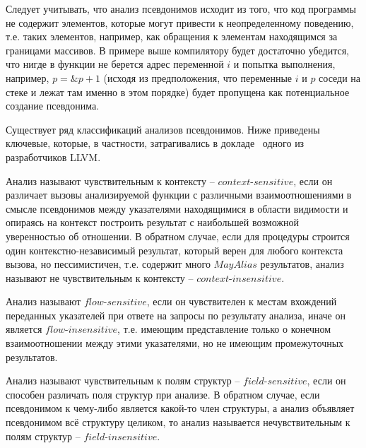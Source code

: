 \begin{myremark}
Следует учитывать, что анализ псевдонимов исходит из того, что код программы не содержит элементов, которые могут привести к неопределенному поведению, т.е. таких элементов, например, как обращения к элементам находящимся за границами массивов. В примере выше компилятору будет достаточно убедится, что нигде в функции не берется адрес переменной $i$ и попытка выполнения, например, $p = \&p + 1$ (исходя из предположения, что переменные $i$ и $p$ соседи на стеке и лежат там именно в этом порядке) будет пропущена как потенциальное создание псевдонима.
\end{myremark}


Существует ряд классификаций анализов псевдонимов. Ниже приведены ключевые, которые, в частности, затрагивались в докладе~\autocite{GohmanAAinLLVM} одного из разработчиков LLVM.

\begin{mydefinition}
Анализ называют чувствительным к контексту -- $context$-$sensitive$, если он различает вызовы анализируемой функции с различными взаимоотношениями в смысле псевдонимов между указателями находящимися в области видимости и опираясь на контекст построить результат с наибольшей возможной уверенностью об отношении. В обратном случае, если для процедуры строится один контекстно-независимый результат, который верен для любого контекста вызова, но пессимистичен, т.е. содержит много $MayAlias$ результатов, анализ называют не чувствительным к контексту -- $context$-$insensitive$.
\end{mydefinition}

\begin{mydefinition}
Анализ называют $flow$-$sensitive$, если он чувствителен к местам вхождений переданных указателей при ответе на запросы по результату анализа, иначе он является $flow$-$insensitive$, т.е. имеющим представление только о конечном взаимоотношении между этими указателями, но не имеющим промежуточных результатов.
\end{mydefinition}

\begin{mydefinition}
Анализ называют чувствительным к полям структур -- $field$-$sensitive$, если он способен различать поля структур при анализе. В обратном случае, если псевдонимом к чему-либо является какой-то член структуры, а анализ объявляет псевдонимом всё структуру целиком, то анализ называется нечувствительным к полям структур -- $field$-$insensitive$.
\end{mydefinition}

